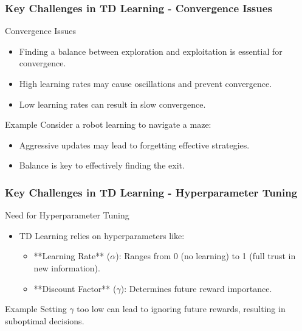 \documentclass[aspectratio=169]{beamer}
\begin{document}
\begin{frame}[fragile]
    \frametitle{Key Challenges in TD Learning - Convergence Issues}
    \begin{block}{Convergence Issues}
        \begin{itemize}
            \item Finding a balance between exploration and exploitation is essential for convergence.
            \item High learning rates may cause oscillations and prevent convergence.
            \item Low learning rates can result in slow convergence.
        \end{itemize}
    \end{block}
    
    \begin{exampleblock}{Example}
        Consider a robot learning to navigate a maze:
        \begin{itemize}
            \item Aggressive updates may lead to forgetting effective strategies.
            \item Balance is key to effectively finding the exit.
        \end{itemize}
    \end{exampleblock}
\end{frame}

\begin{frame}[fragile]
    \frametitle{Key Challenges in TD Learning - Hyperparameter Tuning}
    \begin{block}{Need for Hyperparameter Tuning}
        \begin{itemize}
            \item TD Learning relies on hyperparameters like:
            \begin{itemize}
                \item **Learning Rate** ($\alpha$): Ranges from 0 (no learning) to 1 (full trust in new information).
                \item **Discount Factor** ($\gamma$): Determines future reward importance.
            \end{itemize}
        \end{itemize}
    \end{block}
    
    \begin{exampleblock}{Example}
        Setting $\gamma$ too low can lead to ignoring future rewards, resulting in suboptimal decisions.
    \end{exampleblock}
\end{frame}
\end{document}
